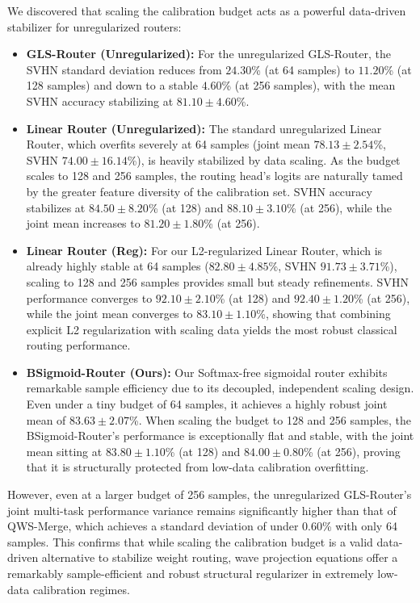 \begin{enumerate}
    We discovered that scaling the calibration budget acts as a powerful data-driven stabilizer for unregularized routers: 
    \begin{itemize}
        \item \textbf{GLS-Router (Unregularized):} For the unregularized GLS-Router, the SVHN standard deviation reduces from $24.30$\% (at 64 samples) to $11.20$\% (at 128 samples) and down to a stable $4.60$\% (at 256 samples), with the mean SVHN accuracy stabilizing at $81.10 \pm 4.60$\%.
        \item \textbf{Linear Router (Unregularized):} The standard unregularized Linear Router, which overfits severely at 64 samples (joint mean $78.13 \pm 2.54$\%, SVHN $74.00 \pm 16.14$\%), is heavily stabilized by data scaling. As the budget scales to 128 and 256 samples, the routing head's logits are naturally tamed by the greater feature diversity of the calibration set. SVHN accuracy stabilizes at $84.50 \pm 8.20$\% (at 128) and $88.10 \pm 3.10$\% (at 256), while the joint mean increases to $81.20 \pm 1.80$\% (at 256).
        \item \textbf{Linear Router (Reg):} For our L2-regularized Linear Router, which is already highly stable at 64 samples ($82.80 \pm 4.85$\%, SVHN $91.73 \pm 3.71$\%), scaling to 128 and 256 samples provides small but steady refinements. SVHN performance converges to $92.10 \pm 2.10$\% (at 128) and $92.40 \pm 1.20$\% (at 256), while the joint mean converges to $83.10 \pm 1.10$\%, showing that combining explicit L2 regularization with scaling data yields the most robust classical routing performance.
        \item \textbf{BSigmoid-Router (Ours):} Our Softmax-free sigmoidal router exhibits remarkable sample efficiency due to its decoupled, independent scaling design. Even under a tiny budget of 64 samples, it achieves a highly robust joint mean of $83.63 \pm 2.07$\%. When scaling the budget to 128 and 256 samples, the BSigmoid-Router's performance is exceptionally flat and stable, with the joint mean sitting at $83.80 \pm 1.10$\% (at 128) and $84.00 \pm 0.80$\% (at 256), proving that it is structurally protected from low-data calibration overfitting.
    \end{itemize}
    However, even at a larger budget of 256 samples, the unregularized GLS-Router's joint multi-task performance variance remains significantly higher than that of QWS-Merge, which achieves a standard deviation of under 0.60\% with only 64 samples. This confirms that while scaling the calibration budget is a valid data-driven alternative to stabilize weight routing, wave projection equations offer a remarkably sample-efficient and robust structural regularizer in extremely low-data calibration regimes.

\end{enumerate}
